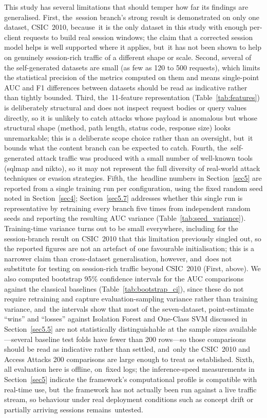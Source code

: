 \documentclass[futureinternet,article,accept,moreauthors]{Definitions/mdpi}
\begin{document}
This study has several limitations that should temper how far its findings are generalised. First, the~session branch's strong result is demonstrated on only one dataset, CSIC~2010, because~it is the only dataset in this study with enough per-client requests to build real session windows; the claim that a corrected session model helps is well supported where it applies, but~it has not been shown to help on genuinely session-rich traffic of a different shape or scale. Second, several of the self-generated datasets are small (as few as 120 to 500 requests), which limits the statistical precision of the metrics computed on them and means single-point AUC and F1 differences between datasets should be read as indicative rather than tightly bounded. Third, the~11-feature representation (Table~\ref{tab:features}) is deliberately structural and does not inspect request bodies or query values directly, so it is unlikely to catch attacks whose payload is anomalous but whose structural shape (method, path length, status code, response size) looks unremarkable; this is a deliberate scope choice rather than an oversight, but~it bounds what the content branch can be expected to catch. Fourth, the~self-generated attack traffic was produced with a small number of well-known tools (sqlmap and nikto), so it may not represent the full diversity of real-world attack techniques or evasion strategies. Fifth, the~headline numbers in Section~\ref{sec5} are reported from a single training run per configuration, using the fixed random seed noted in Section~\ref{sec4}; \mbox{Section~\ref{sec5.7}} addresses whether this single run is representative by retraining every branch five times from independent random seeds and reporting the resulting AUC variance (Table~\ref{tab:seed_variance}). Training-time variance turns out to be small everywhere, including for the session-branch result on CSIC~2010 that this limitation previously singled out, so the reported figures are not an artefact of one favourable initialisation; this is a narrower claim than cross-dataset generalisation, however, and~does not substitute for testing on session-rich traffic beyond CSIC~2010 (First, above). We also computed bootstrap 95\% confidence intervals for the AUC comparisons against the classical baselines (Table~\ref{tab:bootstrap_ci}), since these do not require retraining and capture evaluation-sampling variance rather than training variance, and~the intervals show that most of the seven-dataset, point-estimate ``wins'' and ``losses'' against Isolation Forest and One-Class SVM discussed in Section~\ref{sec5.5} are not statistically distinguishable at the sample sizes available---several baseline test folds have fewer than 200 rows---so those comparisons should be read as indicative rather than settled, and~only the CSIC~2010 and Access Attacks 200 comparisons are large enough to treat as established. Sixth, all evaluation here is offline, on~fixed logs; the inference-speed measurements in Section~\ref{sec5} indicate the framework's computational profile is compatible with real-time use, but~the framework has not actually been run against a live traffic stream, so behaviour under real deployment conditions such as concept drift or partially arriving sessions remains~untested.
\end{document}
